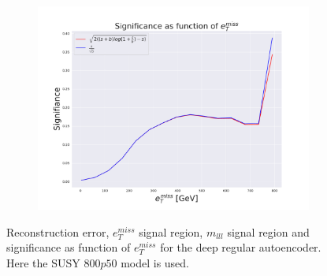 \begin{figure}[H]
    \begin{subfigure}{.40\textwidth}
        \includegraphics[width=\textwidth]{Figures/VAE_testing/big/2lep/significance_etmiss_800p0p050_-0.542414800898212.pdf}
        \caption{}
        \label{fig:VAE_2lep_big_signi_800_2}
    \end{subfigure}
    \hfill      
    \caption[2lep deep network | $800p50$ | VAE | 2]{Reconstruction error, $e_T^{miss}$ signal region, $m_{lll}$ signal region and significance as function of 
    $e_T^{miss}$ for the deep regular autoencoder. Here the SUSY $800p50$ model is used.}
    \label{fig:VAE_2lep_big_rec_sig_signi_800_2}
\end{figure}

